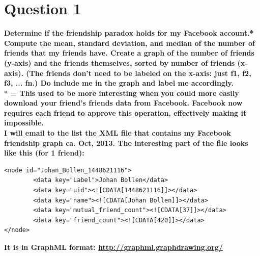 \chapter{Question 1}
\label{intro}

\textbf{Determine if the friendship paradox holds for my Facebook account.* Compute the mean, standard deviation, and median of the number of friends that my friends have.  Create a graph of the number of friends (y-axis) and the friends themselves, sorted by number of friends (x-axis).  (The friends don't need to be labeled on the x-axis: just f1, f2, f3, ... fn.)  Do include me in the graph and label me accordingly.\\
$*$ = This used to be more interesting when you could more easily download your friend's friends data from Facebook.  Facebook now requires each friend to approve this operation, effectively making it impossible.\\
I will email to the list the XML file that contains my Facebook friendship graph ca. Oct, 2013.  The interesting part of the file looks like this (for 1 friend):\\}
\begin{verbatim}
<node id="Johan_Bollen_1448621116">
        <data key="Label">Johan Bollen</data>
        <data key="uid"><![CDATA[1448621116]]></data>
        <data key="name"><![CDATA[Johan Bollen]]></data>
        <data key="mutual_friend_count"><![CDATA[37]]></data>
        <data key="friend_count"><![CDATA[420]]></data>
</node>
\end{verbatim}
\textbf{It is in GraphML format: {\url{http://graphml.graphdrawing.org/}}}\\

